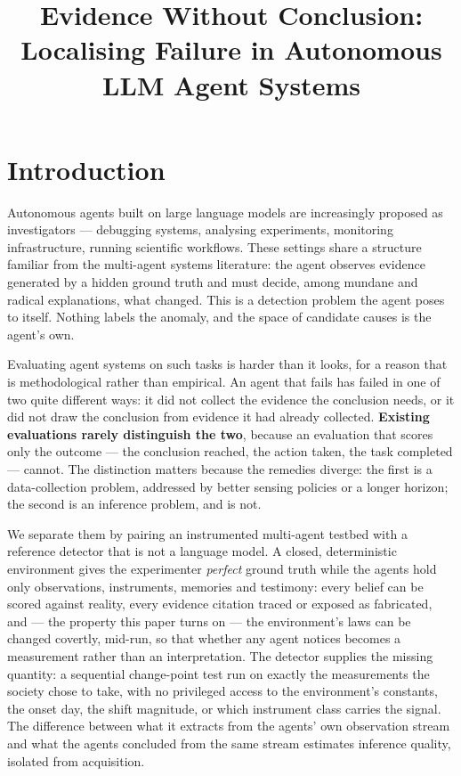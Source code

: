 \documentclass[pdflatex,sn-basic]{sn-jnl}
\title[Evidence Without Conclusion]{Evidence Without Conclusion: Localising Failure in Autonomous LLM Agent Systems}
\author*[1]{\fnm{Nick} \sur{Lamb}}\email{nick@pharmatools.ai}
\affil*[1]{\orgname{Independent Researcher}, \orgaddress{\city{Oxford}, \country{United Kingdom}}}
\begin{document}
\maketitle

\hypertarget{introduction}{%
\section{Introduction}\label{introduction}}

Autonomous agents built on large language models are increasingly proposed as investigators ---
debugging systems, analysing experiments, monitoring infrastructure, running scientific
workflows. These settings share a structure familiar from the multi-agent systems literature:
the agent observes evidence generated by a hidden ground truth and must decide, among mundane
and radical explanations, what changed. This is a detection problem the agent poses to itself.
Nothing labels the anomaly, and the space of candidate causes is the agent's own.

Evaluating agent systems on such tasks is harder than it looks, for a reason that is
methodological rather than empirical. An agent that fails has failed in one of two quite
different ways: it did not collect the evidence the conclusion needs, or it did not draw the
conclusion from evidence it had already collected. \textbf{Existing evaluations rarely distinguish
the two}, because an evaluation that scores only the outcome --- the conclusion reached, the
action taken, the task completed --- cannot. The distinction matters because the remedies
diverge: the first is a data-collection problem, addressed by better sensing policies or a
longer horizon; the second is an inference problem, and is not.

We separate them by pairing an instrumented multi-agent testbed with a reference detector that
is not a language model. A closed, deterministic environment gives the experimenter \emph{perfect}
ground truth while the agents hold only observations, instruments, memories and testimony:
every belief can be scored against reality, every evidence citation traced or exposed as
fabricated, and --- the property this paper turns on --- the environment's laws can be changed
covertly, mid-run, so that whether any agent notices becomes a measurement rather than an
interpretation. The detector supplies the missing quantity: a sequential change-point test run
on exactly the measurements the society chose to take, with no privileged access to the
environment's constants, the onset day, the shift magnitude, or which instrument class carries
the signal. The difference between what it extracts from the agents' own observation stream
and what the agents concluded from the same stream estimates inference quality, isolated from
acquisition.
\end{document}
